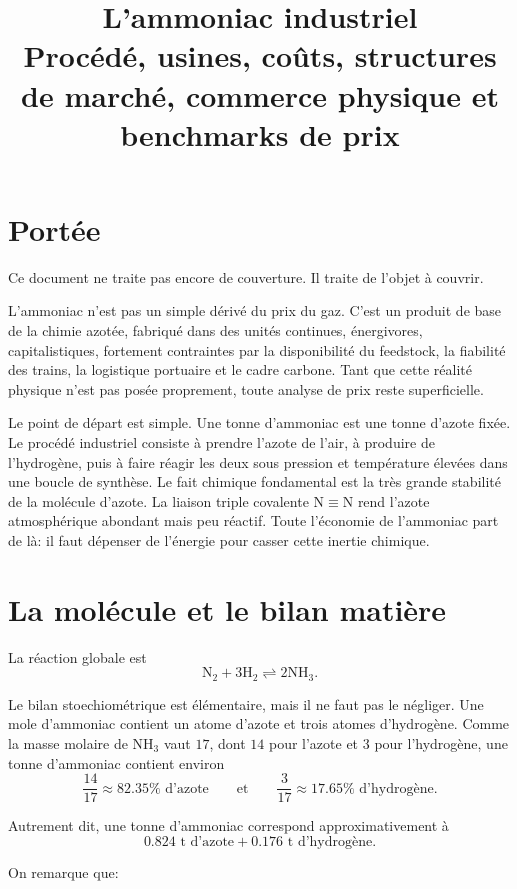 \documentclass[11pt]{article}
\title{\textbf{L'ammoniac industriel}\\
\large Procédé, usines, coûts, structures de marché, commerce physique et benchmarks de prix}
\author{}
\date{}
\begin{document}
\maketitle

\section{Portée}

Ce document ne traite pas encore de couverture. Il traite de l'objet à couvrir.

L'ammoniac n'est pas un simple dérivé du prix du gaz. C'est un produit de base de la chimie azotée, fabriqué dans des unités continues, énergivores, capitalistiques, fortement contraintes par la disponibilité du feedstock, la fiabilité des trains, la logistique portuaire et le cadre carbone. Tant que cette réalité physique n'est pas posée proprement, toute analyse de prix reste superficielle.

Le point de départ est simple. Une tonne d'ammoniac est une tonne d'azote fixée. Le procédé industriel consiste à prendre l'azote de l'air, à produire de l'hydrogène, puis à faire réagir les deux sous pression et température élevées dans une boucle de synthèse. Le fait chimique fondamental est la très grande stabilité de la molécule d'azote. La liaison triple covalente $\mathrm{N \equiv N}$ rend l'azote atmosphérique abondant mais peu réactif. Toute l'économie de l'ammoniac part de là: il faut dépenser de l'énergie pour casser cette inertie chimique.

\section{La molécule et le bilan matière}

La réaction globale est
\[
\mathrm{N_2 + 3H_2 \rightleftharpoons 2NH_3}.
\]

Le bilan stoechiométrique est élémentaire, mais il ne faut pas le négliger. Une mole d'ammoniac contient un atome d'azote et trois atomes d'hydrogène. Comme la masse molaire de $\mathrm{NH_3}$ vaut \(17\), dont \(14\) pour l'azote et \(3\) pour l'hydrogène, une tonne d'ammoniac contient environ
\[
\frac{14}{17} \approx 82.35\% \text{ d'azote}
\qquad\text{et}\qquad
\frac{3}{17} \approx 17.65\% \text{ d'hydrogène}.
\]

Autrement dit, une tonne d'ammoniac correspond approximativement à
\[
0.824 \text{ t d'azote} + 0.176 \text{ t d'hydrogène}.
\]

On remarque que:
\end{document}
